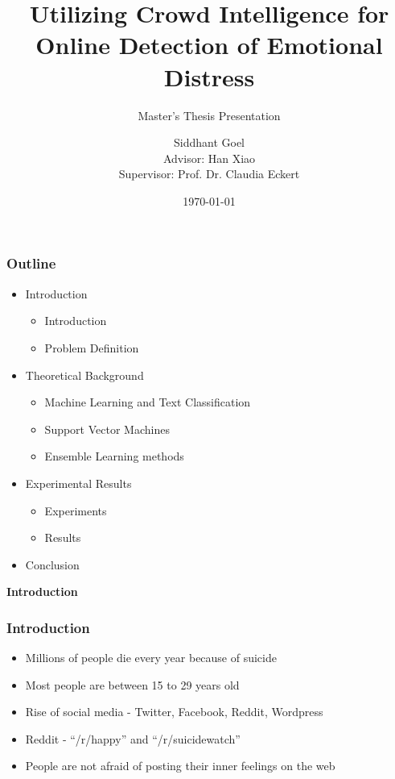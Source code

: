 \documentclass{beamer}
\title{Utilizing Crowd Intelligence for Online Detection of Emotional Distress}
\subtitle{Master's Thesis Presentation}
\author[Siddhant Goel]{Siddhant Goel\\{\small Advisor: Han Xiao\\Supervisor: Prof. Dr. Claudia Eckert}}
\institute{
Chair for IT Security\\
Technische Universit\"at M\"unchen
}
\date{\today}
\begin{document}
    \begin{frame}[plain]
        \titlepage
    \end{frame}
    
    \begin{frame}
        \frametitle{Outline}
        \begin{itemize}
            \item{
            Introduction
            \begin{itemize}
                \item{Introduction}
                \item{Problem Definition}
            \end{itemize}
            }
            \item{
            Theoretical Background
            \begin{itemize}
                \item{Machine Learning and Text Classification}
                \item{Support Vector Machines}
                \item{Ensemble Learning methods}
            \end{itemize}
            }
            \item{
            Experimental Results
            \begin{itemize}
                \item{Experiments}
                \item{Results}
            \end{itemize}
            }
            \item{Conclusion}
        \end{itemize}
    \end{frame}
    
    \begin{frame}
        \begin{center}
            \textbf{Introduction}
        \end{center}
    \end{frame}
    
    \begin{frame}
        \frametitle{Introduction}
        \begin{itemize}
            \item{Millions of people die every year because of suicide}
            \item{Most people are between 15 to 29 years old}
            \item{Rise of social media - Twitter, Facebook, Reddit, Wordpress}
            \item{Reddit - ``/r/happy'' and ``/r/suicidewatch''}
            \item{People are not afraid of posting their inner feelings on the web}
        \end{itemize}
    \end{frame}
    
\end{document}

